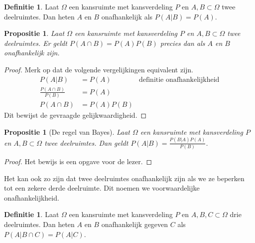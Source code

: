 \documentclass[a4paper]{book}
\newtheorem{proposition}[theorem]{Propositie}
\theoremstyle{definition}
\newtheorem{definition}[theorem]{Definitie}
\begin{document}
\begin{definition}
    Laat $\Omega$ een kansruimte met kansverdeling $P$ en $A,B \subset \Omega$ twee deelruimtes.
    Dan heten $A$ en $B$ onafhankelijk als $P(A|B) = P(A)$.
\end{definition}

\begin{proposition}
    Laat $\Omega$ een kansruimte met kansverdeling $P$ en $A,B \subset \Omega$ twee deelruimtes.
    Er geldt $P(A \cap B) = P(A)P(B)$ precies dan als $A$ en $B$ onafhankelijk zijn.
\end{proposition}
\begin{proof}
    Merk op dat de volgende vergelijkingen equivalent zijn.
    \begin{align*}
        P(A|B)                      &= P(A) & \text{definitie onafhankelijkheid}\\
        \frac{P(A \cap B)}{P(B)}    &= P(A) \\
        P(A \cap B)                 &= P(A)P(B)
    \end{align*}
    Dit bewijst de gevraagde gelijkwaardigheid.
\end{proof}

\begin{proposition}[De regel van Bayes]\label{bayes}
    Laat $\Omega$ een kansruimte met kansverdeling $P$ en $A,B \subset \Omega$ twee deelruimtes.
    Dan geldt $P(A|B) = \frac{P(B|A)P(A)}{P(B)}$.
\end{proposition}
\begin{proof}
    Het bewijs is een opgave voor de lezer.
\end{proof}

Het kan ook zo zijn dat twee deelruimtes onafhankelijk zijn als we ze beperken tot een zekere derde deelruimte.
Dit noemen we voorwaardelijke onafhankelijkheid.
\begin{definition}
    Laat $\Omega$ een kansruimte met kansverdeling $P$ en $A,B,C \subset \Omega$ drie deelruimtes.
    Dan heten $A$ en $B$ onafhankelijk gegeven $C$ als $P(A|B \cap C) = P(A|C)$.
\end{definition}
\end{document}

